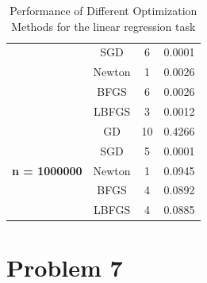 \documentclass[9pt]{IEEEtran}
\begin{document}
\begin{table}[ht]
\begin{tabular}{|c|c|c|c|}
                                         & SGD   & 6     & 0.0001 \\
                                         & Newton& 1     & 0.0026 \\
                                         & BFGS  & 6     & 0.0026 \\
                                         & LBFGS & 3     & 0.0012 \\
        \hline
        \multirow{5}{*}{\textbf{n = 1000000}} & GD    & 10    & 0.4266 \\
                                         & SGD   & 5     & 0.0001 \\
                                         & Newton& 1     & 0.0945 \\
                                         & BFGS  & 4     & 0.0892 \\
                                         & LBFGS & 4     & 0.0885 \\
        \hline
        \end{tabular}
        \vspace{3pt}
        \caption{Performance of Different Optimization Methods for the linear regression task}
        \label{tab:performance}
        \end{table}
      
\section{Problem 7}

        
\end{document}
